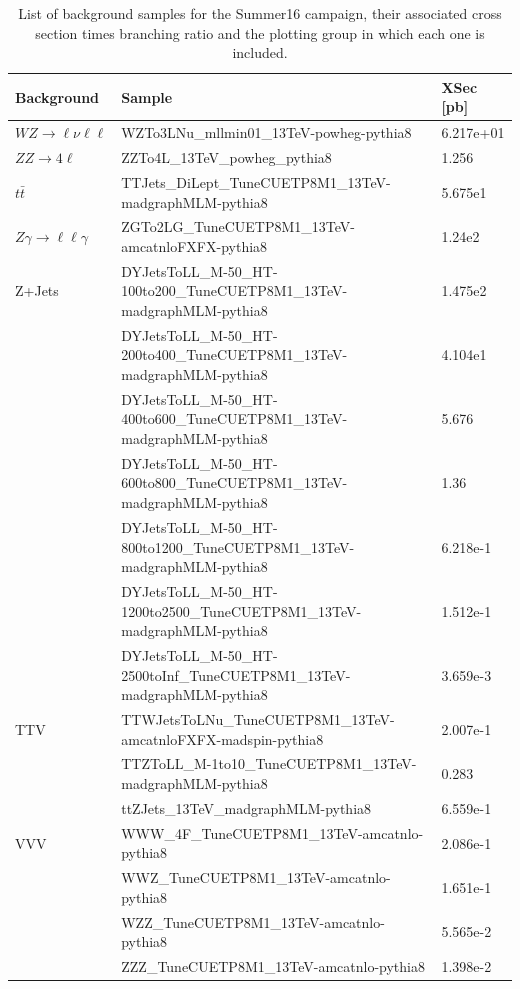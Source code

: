 \begin{table}
\begin{center}
  \caption{List of background samples for the Summer16 campaign, their
    associated cross section times branching ratio and the plotting group
    in which each one is included.}
\footnotesize
\begin{tabular}{|l|l|l|}
\hline
Background  & Sample & XSec [pb] \\ \hline
\hline $WZ\rightarrow\ell\nu\ell\ell$
&WZTo3LNu\_mllmin01\_13TeV-powheg-pythia8  & 6.217e+01 \\
\hline $ZZ\rightarrow4\ell$
&ZZTo4L\_13TeV\_powheg\_pythia8 & 1.256 \\
\hline $t\bar{t}$
&TTJets\_DiLept\_TuneCUETP8M1\_13TeV-madgraphMLM-pythia8 & 5.675e1 \\
\hline $Z\gamma\rightarrow\ell\ell\gamma$
&ZGTo2LG\_TuneCUETP8M1\_13TeV-amcatnloFXFX-pythia8 & 1.24e2 \\
\hline Z+Jets
& DYJetsToLL\_M-50\_HT-100to200\_TuneCUETP8M1\_13TeV-madgraphMLM-pythia8   & 1.475e2 \\
& DYJetsToLL\_M-50\_HT-200to400\_TuneCUETP8M1\_13TeV-madgraphMLM-pythia8   & 4.104e1 \\
& DYJetsToLL\_M-50\_HT-400to600\_TuneCUETP8M1\_13TeV-madgraphMLM-pythia8   & 5.676   \\
& DYJetsToLL\_M-50\_HT-600to800\_TuneCUETP8M1\_13TeV-madgraphMLM-pythia8   & 1.36    \\
& DYJetsToLL\_M-50\_HT-800to1200\_TuneCUETP8M1\_13TeV-madgraphMLM-pythia8  & 6.218e-1\\
& DYJetsToLL\_M-50\_HT-1200to2500\_TuneCUETP8M1\_13TeV-madgraphMLM-pythia8 & 1.512e-1\\
& DYJetsToLL\_M-50\_HT-2500toInf\_TuneCUETP8M1\_13TeV-madgraphMLM-pythia8  & 3.659e-3\\
\hline TTV
&TTWJetsToLNu\_TuneCUETP8M1\_13TeV-amcatnloFXFX-madspin-pythia8 & 2.007e-1 \\
&TTZToLL\_M-1to10\_TuneCUETP8M1\_13TeV-madgraphMLM-pythia8      & 0.283    \\
&ttZJets\_13TeV\_madgraphMLM-pythia8                            & 6.559e-1 \\
\hline VVV
&WWW\_4F\_TuneCUETP8M1\_13TeV-amcatnlo-pythia8 & 2.086e-1 \\
&WWZ\_TuneCUETP8M1\_13TeV-amcatnlo-pythia8     & 1.651e-1 \\
&WZZ\_TuneCUETP8M1\_13TeV-amcatnlo-pythia8     & 5.565e-2 \\
&ZZZ\_TuneCUETP8M1\_13TeV-amcatnlo-pythia8     & 1.398e-2 \\

\end{tabular}
\end{center}
\end{table}
